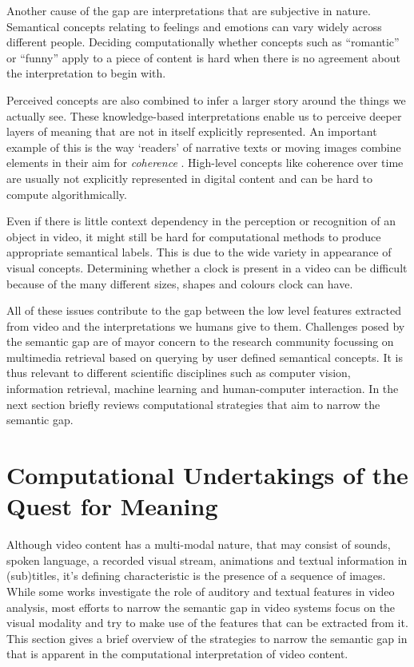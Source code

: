 Another cause of the gap are interpretations that are subjective in nature. Semantical concepts relating to feelings and emotions can vary widely across different people. Deciding computationally whether concepts such as ``romantic'' or ``funny'' apply to a piece of content is hard when there is no agreement about the interpretation to begin with.

Perceived concepts are also combined to infer a larger story around the things we actually see. These knowledge-based interpretations enable us to perceive deeper layers of meaning that are not in itself explicitly represented. An important example of this is the way `readers' of narrative texts or moving images combine elements in their aim for \emph{coherence}\cite[p.~38]{Bordwell:1985tz} \cite{gernsbacher1995coherence, Graesser:1994va}. High-level concepts like coherence over time are usually not explicitly represented in digital content and can be hard to compute algorithmically.

Even if there is little context dependency in the perception or recognition of an object in video, it might still be hard for computational methods to produce appropriate semantical labels. This is due to the wide variety in appearance of visual concepts. Determining whether a clock is present in a video can be difficult because of the many different sizes, shapes and colours clock can have. 

All of these issues contribute to the gap between the low level features extracted from video and the interpretations we humans give to them. Challenges posed by the semantic gap are of mayor concern to the research community focussing on multimedia retrieval based on querying by user defined semantical concepts. It is thus relevant to different scientific disciplines such as computer vision, information retrieval, machine learning and human-computer interaction. In the next section briefly reviews computational strategies that aim to narrow the semantic gap.

\section{Computational Undertakings of the Quest for Meaning}

Although video content has a multi-modal nature, that may consist of sounds, spoken language, a recorded visual stream, animations and textual information in (sub)titles, it's defining characteristic is the presence of a sequence of images. While some works investigate the role of auditory\cite{Wang:2000vf} and textual features\cite{Kuwano:2000wy} in video analysis, most efforts to narrow the semantic gap in video systems focus on the visual modality and try to make use of the features that can be extracted from it. This section gives a brief overview of the strategies to narrow the semantic gap in that is apparent in the computational interpretation of video content.

